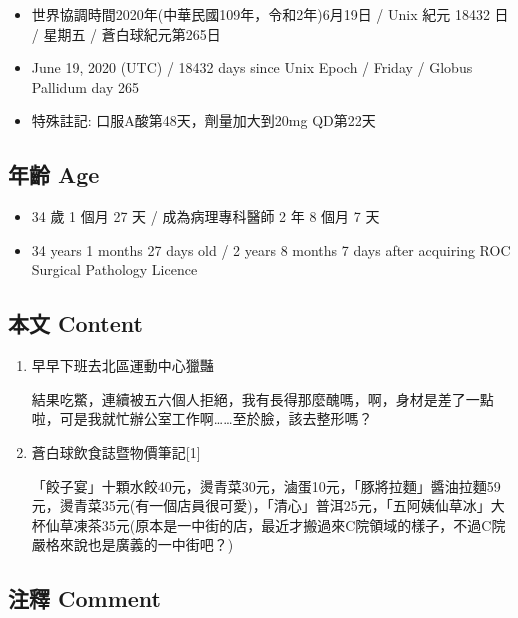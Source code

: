 \documentclass[
]{article}
\providecommand{\tightlist}{%
  \setlength{\itemsep}{0pt}\setlength{\parskip}{0pt}}
\begin{document}
\begin{itemize}
\tightlist
\item
  世界協調時間2020年(中華民國109年，令和2年)6月19日 / Unix 紀元 18432 日
  / 星期五 / 蒼白球紀元第265日
\item
  June 19, 2020 (UTC) / 18432 days since Unix Epoch / Friday / Globus
  Pallidum day 265
\item
  特殊註記: 口服A酸第48天，劑量加大到20mg QD第22天
\end{itemize}

\hypertarget{ux5e74ux9f61-age-16}{%
\subsection{年齡 Age}\label{ux5e74ux9f61-age-16}}

\begin{itemize}
\tightlist
\item
  34 歲 1 個月 27 天 / 成為病理專科醫師 2 年 8 個月 7 天
\item
  34 years 1 months 27 days old / 2 years 8 months 7 days after
  acquiring ROC Surgical Pathology Licence
\end{itemize}

\hypertarget{ux672cux6587-content-16}{%
\subsection{本文 Content}\label{ux672cux6587-content-16}}

\begin{enumerate}
\def\labelenumi{\arabic{enumi}.}
\item
  早早下班去北區運動中心獵豔

  結果吃鱉，連續被五六個人拒絕，我有長得那麼醜嗎，啊，身材是差了一點啦，可是我就忙辦公室工作啊\ldots\ldots 至於臉，該去整形嗎？
\item
  蒼白球飲食誌暨物價筆記{[}1{]}

  「餃子宴」十顆水餃40元，燙青菜30元，滷蛋10元，「豚將拉麵」醬油拉麵59元，燙青菜35元(有一個店員很可愛)，「清心」普洱25元，「五阿姨仙草冰」大杯仙草凍茶35元(原本是一中街的店，最近才搬過來C院領域的樣子，不過C院嚴格來說也是廣義的一中街吧？)
\end{enumerate}

\hypertarget{ux6ce8ux91cb-comment-16}{%
\subsection{注釋 Comment}\label{ux6ce8ux91cb-comment-16}}
\end{document}
